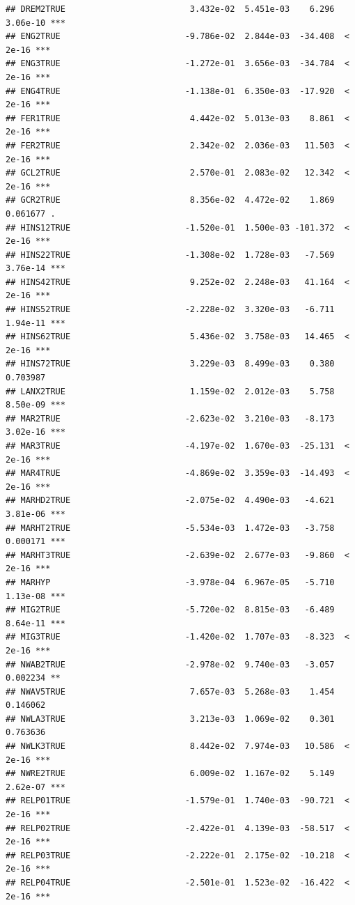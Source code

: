 \documentclass[
]{article}
\begin{document}
\begin{verbatim}
## DREM2TRUE                         3.432e-02  5.451e-03    6.296 3.06e-10 ***
## ENG2TRUE                         -9.786e-02  2.844e-03  -34.408  < 2e-16 ***
## ENG3TRUE                         -1.272e-01  3.656e-03  -34.784  < 2e-16 ***
## ENG4TRUE                         -1.138e-01  6.350e-03  -17.920  < 2e-16 ***
## FER1TRUE                          4.442e-02  5.013e-03    8.861  < 2e-16 ***
## FER2TRUE                          2.342e-02  2.036e-03   11.503  < 2e-16 ***
## GCL2TRUE                          2.570e-01  2.083e-02   12.342  < 2e-16 ***
## GCR2TRUE                          8.356e-02  4.472e-02    1.869 0.061677 .  
## HINS12TRUE                       -1.520e-01  1.500e-03 -101.372  < 2e-16 ***
## HINS22TRUE                       -1.308e-02  1.728e-03   -7.569 3.76e-14 ***
## HINS42TRUE                        9.252e-02  2.248e-03   41.164  < 2e-16 ***
## HINS52TRUE                       -2.228e-02  3.320e-03   -6.711 1.94e-11 ***
## HINS62TRUE                        5.436e-02  3.758e-03   14.465  < 2e-16 ***
## HINS72TRUE                        3.229e-03  8.499e-03    0.380 0.703987    
## LANX2TRUE                         1.159e-02  2.012e-03    5.758 8.50e-09 ***
## MAR2TRUE                         -2.623e-02  3.210e-03   -8.173 3.02e-16 ***
## MAR3TRUE                         -4.197e-02  1.670e-03  -25.131  < 2e-16 ***
## MAR4TRUE                         -4.869e-02  3.359e-03  -14.493  < 2e-16 ***
## MARHD2TRUE                       -2.075e-02  4.490e-03   -4.621 3.81e-06 ***
## MARHT2TRUE                       -5.534e-03  1.472e-03   -3.758 0.000171 ***
## MARHT3TRUE                       -2.639e-02  2.677e-03   -9.860  < 2e-16 ***
## MARHYP                           -3.978e-04  6.967e-05   -5.710 1.13e-08 ***
## MIG2TRUE                         -5.720e-02  8.815e-03   -6.489 8.64e-11 ***
## MIG3TRUE                         -1.420e-02  1.707e-03   -8.323  < 2e-16 ***
## NWAB2TRUE                        -2.978e-02  9.740e-03   -3.057 0.002234 ** 
## NWAV5TRUE                         7.657e-03  5.268e-03    1.454 0.146062    
## NWLA3TRUE                         3.213e-03  1.069e-02    0.301 0.763636    
## NWLK3TRUE                         8.442e-02  7.974e-03   10.586  < 2e-16 ***
## NWRE2TRUE                         6.009e-02  1.167e-02    5.149 2.62e-07 ***
## RELP01TRUE                       -1.579e-01  1.740e-03  -90.721  < 2e-16 ***
## RELP02TRUE                       -2.422e-01  4.139e-03  -58.517  < 2e-16 ***
## RELP03TRUE                       -2.222e-01  2.175e-02  -10.218  < 2e-16 ***
## RELP04TRUE                       -2.501e-01  1.523e-02  -16.422  < 2e-16 ***

\end{verbatim}
\end{document}
